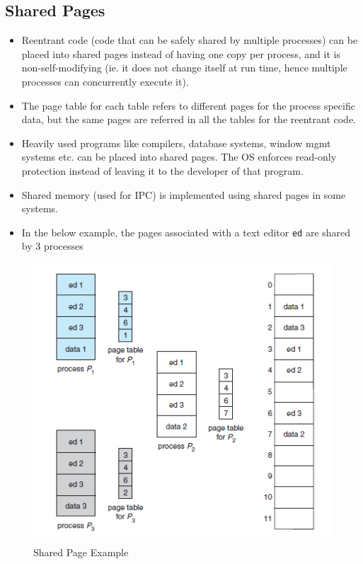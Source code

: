 \documentclass{article}
\theoremstyle{plain}
\theoremstyle{definition}
\begin{document}
\subsection{Shared Pages}
\begin{itemize}
    \item Reentrant code (code that can be safely shared by multiple processes) can be placed into shared pages instead of having one copy per process, and it is non-self-modifying (ie. it does not change itself at run time, hence multiple processes can concurrently execute it). 
    \item The page table for each table refers to different pages for the process specific data, but the same pages are referred in all the tables for the reentrant code. 
    
    \item Heavily used programs like compilers, database systems, window mgmt systems etc. can be placed into shared pages. The OS enforces read-only protection instead of leaving it to the developer of that program. 
    
    \item Shared memory (used for IPC) is implemented using shared pages in some systems. 
    
    \item In the below example, the pages associated with a text editor \texttt{ed} are shared by 3 processes
\end{itemize} 

\begin{figure}[!h]
    \centering
    \includegraphics[scale=0.8]{os6.png}
    \caption{Shared Page Example}
    \label{fig:my_label_6}
\end{figure}
\end{document}
